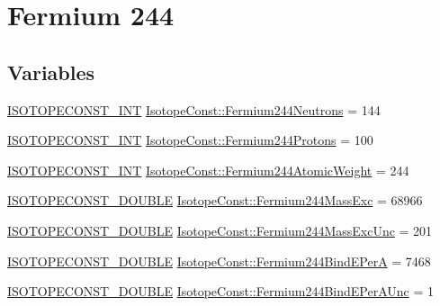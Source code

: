 \hypertarget{group___isotope_const-_fermium-_fm244}{}\section{Fermium 244}
\label{group___isotope_const-_fermium-_fm244}
\subsection*{Variables}
\begin{DoxyCompactItemize}
\item 
\mbox{\hyperlink{group___isotope_const-_macros_ga5f18360b3e99483a35c32d789e62621c}{I\+S\+O\+T\+O\+P\+E\+C\+O\+N\+S\+T\+\_\+\+I\+NT}} \mbox{\hyperlink{group___isotope_const-_fermium-_fm244_ga683536860c52f4eae0fccdfd3106ec1f}{Isotope\+Const\+::\+Fermium244\+Neutrons}} = 144
\item 
\mbox{\hyperlink{group___isotope_const-_macros_ga5f18360b3e99483a35c32d789e62621c}{I\+S\+O\+T\+O\+P\+E\+C\+O\+N\+S\+T\+\_\+\+I\+NT}} \mbox{\hyperlink{group___isotope_const-_fermium-_fm244_ga0fb9dcca7f09929c217c82c27d34f4b0}{Isotope\+Const\+::\+Fermium244\+Protons}} = 100
\item 
\mbox{\hyperlink{group___isotope_const-_macros_ga5f18360b3e99483a35c32d789e62621c}{I\+S\+O\+T\+O\+P\+E\+C\+O\+N\+S\+T\+\_\+\+I\+NT}} \mbox{\hyperlink{group___isotope_const-_fermium-_fm244_ga5f6fb776f9e294aeac1e723b3ac6234a}{Isotope\+Const\+::\+Fermium244\+Atomic\+Weight}} = 244
\item 
\mbox{\hyperlink{group___isotope_const-_macros_ga8f45a7272ce02c0b4c65c44636ed719a}{I\+S\+O\+T\+O\+P\+E\+C\+O\+N\+S\+T\+\_\+\+D\+O\+U\+B\+LE}} \mbox{\hyperlink{group___isotope_const-_fermium-_fm244_ga7af22d201ba12acd79ca75c6b6a62283}{Isotope\+Const\+::\+Fermium244\+Mass\+Exc}} = 68966
\item 
\mbox{\hyperlink{group___isotope_const-_macros_ga8f45a7272ce02c0b4c65c44636ed719a}{I\+S\+O\+T\+O\+P\+E\+C\+O\+N\+S\+T\+\_\+\+D\+O\+U\+B\+LE}} \mbox{\hyperlink{group___isotope_const-_fermium-_fm244_gaefb52ac2682dc5e8f5f7bbfa4913358d}{Isotope\+Const\+::\+Fermium244\+Mass\+Exc\+Unc}} = 201
\item 
\mbox{\hyperlink{group___isotope_const-_macros_ga8f45a7272ce02c0b4c65c44636ed719a}{I\+S\+O\+T\+O\+P\+E\+C\+O\+N\+S\+T\+\_\+\+D\+O\+U\+B\+LE}} \mbox{\hyperlink{group___isotope_const-_fermium-_fm244_gad6c6bbe25fc66aa42444fcfc91a3ccac}{Isotope\+Const\+::\+Fermium244\+Bind\+E\+PerA}} = 7468
\item 
\mbox{\hyperlink{group___isotope_const-_macros_ga8f45a7272ce02c0b4c65c44636ed719a}{I\+S\+O\+T\+O\+P\+E\+C\+O\+N\+S\+T\+\_\+\+D\+O\+U\+B\+LE}} \mbox{\hyperlink{group___isotope_const-_fermium-_fm244_gafe3ae12510e8fce5c4bfd46ecf5e65f6}{Isotope\+Const\+::\+Fermium244\+Bind\+E\+Per\+A\+Unc}} = 1

\end{DoxyCompactItemize}
